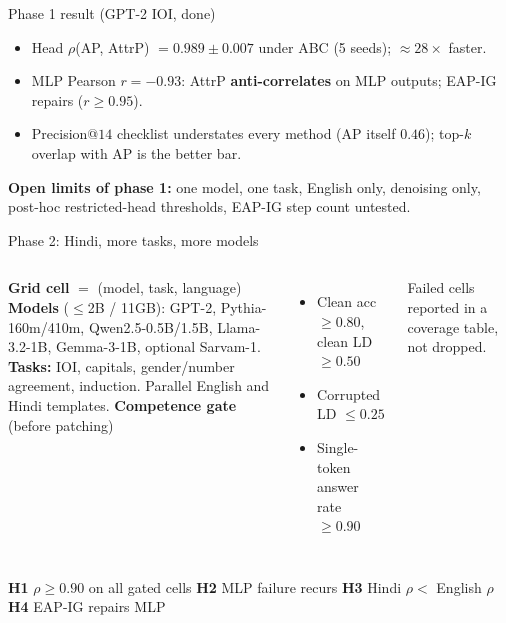\documentclass[aspectratio=169,10pt]{beamer}
\begin{document}
\begin{frame}{Phase 1 result (GPT-2 IOI, done)}
\begin{itemize}
\item Head $\rho$(AP, AttrP) $= 0.989 \pm 0.007$ under ABC (5 seeds); $\approx 28\times$ faster.
\item MLP Pearson $r = -0.93$: AttrP \textbf{anti-correlates} on MLP outputs; EAP-IG repairs ($r \ge 0.95$).
\item Precision@$14$ checklist understates every method (AP itself $0.46$); top-$k$ overlap with AP is the better bar.
\end{itemize}
\vspace{0.4em}
\textbf{Open limits of phase 1:} one model, one task, English only, denoising only, post-hoc restricted-head thresholds, EAP-IG step count untested.
\end{frame}

\begin{frame}{Phase 2: Hindi, more tasks, more models}
\begin{columns}[T]
\textbf{Grid cell} $=$ (model, task, language)\\[4pt]
\textbf{Models} ($\le$2B / 11GB): GPT-2, Pythia-160m/410m, Qwen2.5-0.5B/1.5B, Llama-3.2-1B, Gemma-3-1B, optional Sarvam-1.\\[4pt]
\textbf{Tasks:} IOI, capitals, gender/number agreement, induction. Parallel English and Hindi templates.
\textbf{Competence gate} (before patching)
\begin{itemize}
\item Clean acc $\ge 0.80$, clean LD $\ge 0.50$
\item Corrupted LD $\le 0.25$
\item Single-token answer rate $\ge 0.90$
\end{itemize}
Failed cells reported in a coverage table, not dropped.
\end{columns}
\vspace{0.3em}
\textbf{H1} $\rho \ge 0.90$ on all gated cells \quad
\textbf{H2} MLP failure recurs \quad
\textbf{H3} Hindi $\rho <$ English $\rho$ \quad
\textbf{H4} EAP-IG repairs MLP
\end{frame}
\end{document}
